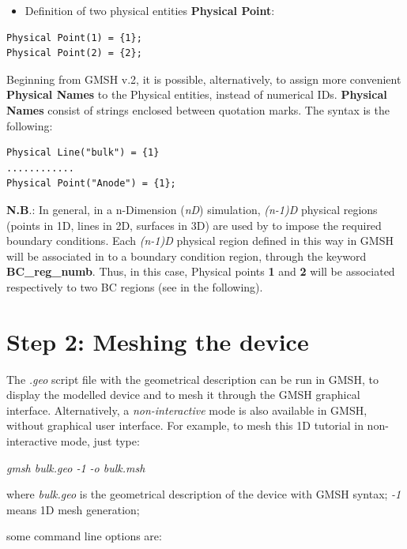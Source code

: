 \begin{itemize}
\item Definition of two physical entities\textbf{ Physical Point}:  
\end{itemize}

\begin{verbatim}
Physical Point(1) = {1};
Physical Point(2) = {2}; 
\end{verbatim}

Beginning  from  GMSH v.2, it  is  possible, alternatively,   to  assign  more  convenient \textbf{Physical Names}  to  the  Physical entities, instead of  numerical IDs.  \textbf{Physical Names} consist of  strings  enclosed between  quotation marks.
The  syntax is the  following:

\begin{verbatim}
Physical Line("bulk") = {1}
............
Physical Point("Anode") = {1};
\end{verbatim}



    \textbf{N.B}.: In general, in a n-Dimension (\textit{nD}) simulation, \textit{(n-1)D }physical regions (points in 1D, lines in 2D, surfaces in 3D) are used by \TiberCAD{} to impose the required boundary conditions.
      Each  \textit{(n-1)D } physical region defined in this way in GMSH will be associated in \TiberCAD{} to a boundary condition region, through the keyword \textbf{BC\_reg\_numb}. Thus, in this case, Physical points \textbf{1} and \textbf{2} will be associated respectively to two BC regions (see in the following).






\section*{Step 2: Meshing the device}

The \textit{.geo} script file with the geometrical description can be run in GMSH, to display the modelled device and to mesh it through the GMSH graphical interface.
Alternatively, a \textit{non-interactive} mode is also available in GMSH, without graphical user interface. For example, to mesh this 1D tutorial in non-interactive mode, just type:

\textit{gmsh bulk.geo  -1 -o bulk.msh }

where \textit{bulk.geo}  is the geometrical description of the device with GMSH syntax;
\textit{-1} means 1D mesh generation;

some command line options are:

